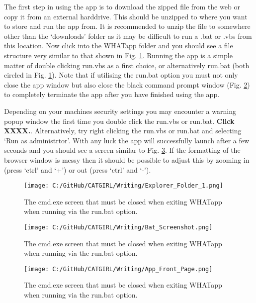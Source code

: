 \documentclass[11pt]{article}
\begin{document}
The first step in using the app is to download the zipped file from the web or copy it from an external harddrive. This should be unzipped to where you want to store and run the app from. It is recommended to unzip the file to somewhere other than the `downloads' folder as it may be difficult to run a .bat or .vbs from this location. Now click into the WHATapp folder and you should see a file structure very similar to that shown in Fig. \ref{fig:expl1screen}. Running the app is a simple matter of double clicking run.vbs as a first choice, or alternatively run.bat (both circled in Fig. \ref{fig:expl1screen}). Note that if utilising the run.bat option you must not only close the app window but also close the black command prompt window (Fig. \ref{fig:batscreen}) to completely terminate the app after you have finished using the app.

Depending on your machines security settings you may encounter a warning popup window the first time you double click the run.vbs or run.bat. {\bf Click XXXX.}. Alternatively, try right clicking the run.vbs or run.bat and selecting `Run as administrtor'. With any luck the app will successfully launch after a few seconds and you should see a screen similar to Fig. \ref{fig:frontpg}. If the formatting of the browser window is messy then it should be possible to adjust this by zooming in (press `ctrl' and `+') or out (press `ctrl' and `-').

 \begin{figure} [h]
  \centering
\texttt{[image: C:/GitHub/CATGIRL/Writing/Explorer\_Folder\_1.png]}
  \caption {The cmd.exe screen that must be closed when exiting WHATapp when running via the run.bat option.}
  \label{fig:expl1screen}
\end{figure}



 \begin{figure} [h]
  \centering
\texttt{[image: C:/GitHub/CATGIRL/Writing/Bat\_Screenshot.png]}
  \caption {The cmd.exe screen that must be closed when exiting WHATapp when running via the run.bat option.}
  \label{fig:batscreen}
\end{figure}


 \begin{figure} [h]
  \centering
\texttt{[image: C:/GitHub/CATGIRL/Writing/App\_Front\_Page.png]}
  \caption {The cmd.exe screen that must be closed when exiting WHATapp when running via the run.bat option.}
  \label{fig:frontpg}
\end{figure}
\end{document}
